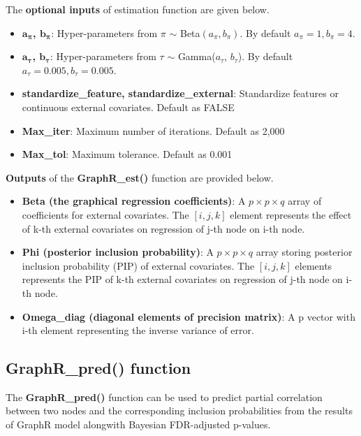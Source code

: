 \documentclass[
]{book}
\begin{document}
The \textbf{optional inputs} of estimation function are given below.

\begin{itemize}
\item
  \textbf{\(\boldsymbol a_{\boldsymbol \pi}\), \(\boldsymbol b_{\boldsymbol \pi}\)}: Hyper-parameters from \(\pi\) \(\sim\) Beta\((a_\pi, b_\pi)\). By default \(a_\pi = 1, b_\pi=4\).
\item
  \textbf{\(\boldsymbol a_{\boldsymbol \tau}\), \(\boldsymbol b_{\boldsymbol \tau}\)}: Hyper-parameters from \(\tau\) \(\sim\) Gamma(\(a_{\tau}\), \(b_{\tau}\)). By default \(a_\tau=0.005, b_\tau=0.005\).
\item
  \textbf{standardize\_feature, standardize\_external}: Standardize features or continuous external covariates. Default as FALSE
\item
  \textbf{Max\_iter}: Maximum number of iterations. Default as 2,000
\item
  \textbf{Max\_tol}: Maximum tolerance. Default as 0.001
\end{itemize}

\textbf{Outputs} of the \textbf{GraphR\_est()} function are provided below.

\begin{itemize}
\item
  \textbf{Beta (the graphical regression coefficients)}: A \(p \times p \times q\) array of coefficients for external covariates. The \([i,j,k]\) element represents the effect of k-th external covariates on regression of j-th node on i-th node.
\item
  \textbf{Phi (posterior inclusion probability)}: A \(p \times p \times q\) array storing posterior inclusion probability (PIP) of external covariates. The \([i,j,k]\) elements represents the PIP of k-th external covariates on regression of j-th node on i-th node.
\item
  \textbf{Omega\_diag (diagonal elements of precision matrix)}: A p vector with i-th element representing the inverse variance of error.
\end{itemize}

\hypertarget{graphr_pred-function}{%
\subsection{GraphR\_pred() function}\label{graphr_pred-function}}

The \textbf{GraphR\_pred()} function can be used to predict partial correlation between two nodes and the corresponding inclusion probabilities from the results of GraphR model alongwith Bayesian FDR-adjusted p-values.
\end{document}
